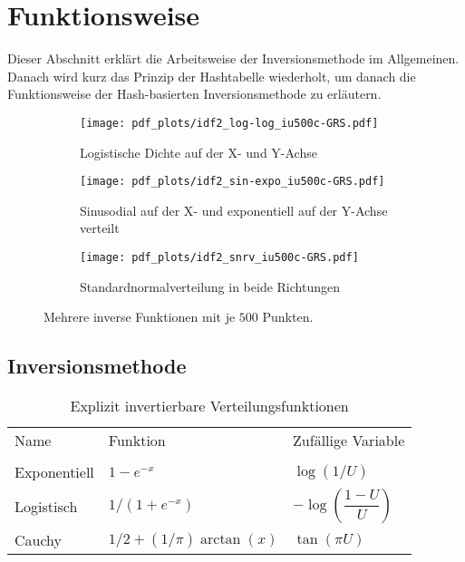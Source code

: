 \section{Funktionsweise}
\label{funktion}

Dieser Abschnitt erklärt die Arbeitsweise der Inversionsmethode im Allgemeinen. 
Danach wird kurz das Prinzip der Hashtabelle wiederholt, um danach die 
Funktionsweise der Hash-basierten Inversionsmethode zu erläutern.

\begin{figure*}%
    \centering
    \begin{subfigure}[b]{.3\textwidth}
        \centering
        \texttt{[image: pdf\_plots/idf2\_log-log\_iu500c-GRS.pdf]}
        \caption{Logistische Dichte auf der X- und Y-Achse}
        \label{fig:loglog_examplePlot}
    \end{subfigure}
    \hfill
    \begin{subfigure}[b]{.3\textwidth}
        \centering
        \texttt{[image: pdf\_plots/idf2\_sin-expo\_iu500c-GRS.pdf]}
        \caption{Sinusodial auf der X- und exponentiell auf der Y-Achse verteilt}
        \label{fig:sinexpo_examplePlot}
    \end{subfigure}
    \hfill
    \begin{subfigure}[b]{.3\textwidth}
        \centering
        \texttt{[image: pdf\_plots/idf2\_snrv\_iu500c-GRS.pdf]}
        \caption{Standardnormalverteilung in beide Richtungen}
        \label{fig:snrv_examplePlot}
    \end{subfigure}
    \caption{Mehrere inverse Funktionen mit je $500$ Punkten.}
    \label{fig:examplePlot}
\end{figure*}


\subsection{Inversionsmethode}
\begin{table}%
    \centering
    \begin{tabular}{lll}
    Name         & Funktion & Zufällige Variable \\
                 &          &                    \\
    Exponentiell & $1 - e^{-x}$ & $\log(1/U)$ \\
    Logistisch   & $1 / (1 + e^{-x})$ & $-\log(\dfrac{1-U}{U})$ \\
    Cauchy       & $1/2 + (1/\pi) \arctan(x)$ & $\tan(\pi U)$
    \end{tabular}
    \caption{Explizit invertierbare Verteilungsfunktionen \cite{devroye-non_uniform_random_variate-1986}}
    \label{tab:invFuncs}
\end{table}

